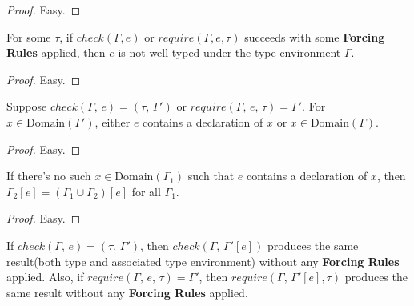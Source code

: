 \documentclass[peerreview, 10pt]{IEEEtran}
\newcommand{\checktype}[4]{\ensuremath{{check}(#1,\,#2)=(#3,\,#4)}}
\newcommand{\requiretype}[4]{\ensuremath{{require}(#1,\,#2,\,#3)=#4}}
\newcommand{\domain}[1]{\ensuremath{\text{Domain}(#1)}}
\begin{document}
\begin{proof}
    Easy.
\end{proof}

\begin{theorem}
    \label{thm:check-ill-typed}
    For some $\tau$, if $check(\Gamma, e)$ or $require(\Gamma, e, \tau)$ succeeds with some \textbf{Forcing Rules} applied, then $e$ is not well-typed under the type environment $\Gamma$.
\end{theorem}

\begin{proof}
    Easy.
\end{proof}

\begin{lemma}
    \label{lem:contains-declaration-or-tenv}
    Suppose \checktype{\Gamma}{e}{\tau}{\Gamma'} or \requiretype{\Gamma}{e}{\tau}{\Gamma'}. For $x \in\domain{\Gamma'}$, either $e$ contains a declaration of $x$ or $x\in\domain{\Gamma}$.
\end{lemma}

\begin{proof}
    Easy.
\end{proof}

\begin{lemma}
    \label{lem:apply-iden}
    If there's no such $x\in\domain{\Gamma_1}$ such that $e$ contains a declaration of $x$, then $\Gamma_2[e]=(\Gamma_1\cup\Gamma_2)[e]$ for all $\Gamma_1$.
\end{lemma}

\begin{proof}
    Easy.
\end{proof}

\begin{theorem}
    \label{thm:check-apply}
    If $\checktype{\Gamma}{e}{\tau}{\Gamma'}$, then $check(\Gamma,\,\Gamma'[e])$ produces the same result(both type and associated type environment) without any \textbf{Forcing Rules} applied. Also, if $\requiretype{\Gamma}{e}{\tau}{\Gamma'}$, then $require(\Gamma,\,\Gamma'[e], \tau)$ produces the same result without any \textbf{Forcing Rules} applied.
\end{theorem}
\end{document}
